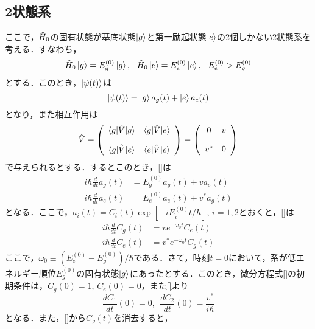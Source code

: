 \subsection{2状態系}
ここで，${\hat{H}}_0$の固有状態が基底状態$\ket{g}$と第一励起状態$\ket{e}$の2個しかない2状態系を考える．すなわち，
\begin{equation}
    \hH_0\ket{g}=E_g^{(0)}\ket{g},\ \ \hH_0\ket{e}=E_e^{(0)}\ket{e},\ \ E_e^{(0)}>E_g^{(0)}
\end{equation}
とする．このとき，$\ket{\psi(t)}$は
\begin{equation}
    \ket{\psi(t)}=\ket{g}a_g(t)+\ket{e}a_e(t)
\end{equation}
となり，また相互作用は
\begin{equation}
    \hat{V} = \left(
        \begin{array}{cc}
       \braket{g|\hat{V}|g}&\braket{g|\hat{V}|e} \\[10pt]
        \braket{g|\hat{V}|e}&\braket{e|\hat{V}|e} \\
        \end{array}
        \right)
        =
        \left(
        \begin{array}{cc}
       0&v\\[10pt]
        v^{\ast}&0 \\
        \end{array}
        \right)
\end{equation}
で与えられるとする．するとこのとき，\eqref{}は
\begin{align}
    i\hbar\frac{d}{dt}a_g(t)&=E_g^{(0)}a_g(t)+v a_e(t)\\[10pt]
    i\hbar\frac{d}{dt}a_e(t)&=E_e^{(0)}a_e(t)+v^{\ast} a_g(t)
\end{align}
となる．ここで，$a_i(t)=C_i(t)\exp{[-iE_i^{(0)}t/\hbar]}$, $i=1,2$とおくと，\eqref{}は
\begin{align}
    i\hbar\frac{d}{dt}C_g(t)&=ve^{-\omega_0t}C_e(t)\\[10pt]
    i\hbar\frac{d}{dt}C_e(t)&=v^{\ast}e^{-\omega_0t} C_g(t)
\end{align}
ここで，$\omega_0\equiv(E_e^{(0)}-E_g^{(0)})/\hbar$である．さて，時刻$t=0$において，系が低エネルギー順位$E_g^{(0)}$の固有状態$\ket{g}$にあったとする．このとき，微分方程式\eqref{}の初期条件は，$C_g(0)=1$, $C_e(0)=0$，また\eqref{}より
\begin{equation}
    \frac{dC_1}{dt}(0)=0,\ \ \frac{dC_2}{dt}(0)=\frac{v^{\ast}}{i\hbar}
\end{equation}
となる．また，\eqref{}から$C_g(t)$を消去すると，

